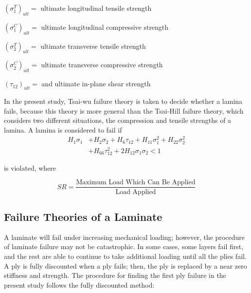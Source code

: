\documentclass[Afour,sagev,times]{sagej}
\begin{document}
$(\sigma _1^{T})_{ult}= $ ultimate longitudinal tensile strength

$(\sigma _1^{C})_{ult}= $ ultimate longitudinal compressive strength

$(\sigma _2^{T})_{ult}= $ ultimate transverse tensile strength

$(\sigma _2^{C})_{ult}= $ ultimate transverse compressive strength 

$(\tau_{12})_{ult}= $ and ultimate in-plane shear strength

In the present study, Tsai-wu failure theory is taken to decide whether a lamina fails,
because this theory is more general than the Tsai-Hill failure theory, which considers two
different situations, the compression and tensile strengths of a lamina. A lamina is considered to fail
if \begin{equation} \label{eq:tsai_wu}
\begin{split}
	H_1 \sigma_1  & + H_2 \sigma_2 + H_6 \tau_{12} + H_{11}\sigma_1^2 + H_{22} \sigma_2^2 \\
				  & + H_{66}  \tau_{12}^2 + 2H_{12}\sigma_1\sigma_2 < 1
\end{split}
\end{equation}

is violated, where

\begin{equation} \label{eq:sr}S R=\frac{\text {Maximum Load Which Can Be Applied}}{\text {Load Applied}}
\end{equation}


\subsection{Failure Theories of a Laminate}
A laminate will fail under increasing mechanical loading; however, the procedure of laminate failure may not
be catastrophic.
 In some cases, some layers fail first, and the rest are able to continue to take additional loading
 until all the plies fail. A ply is fully discounted when a ply fails; then, the ply is replaced
by a near zero stiffness and strength. 
The procedure for finding the first ply failure in the present
study follows the fully discounted method:
\end{document}
